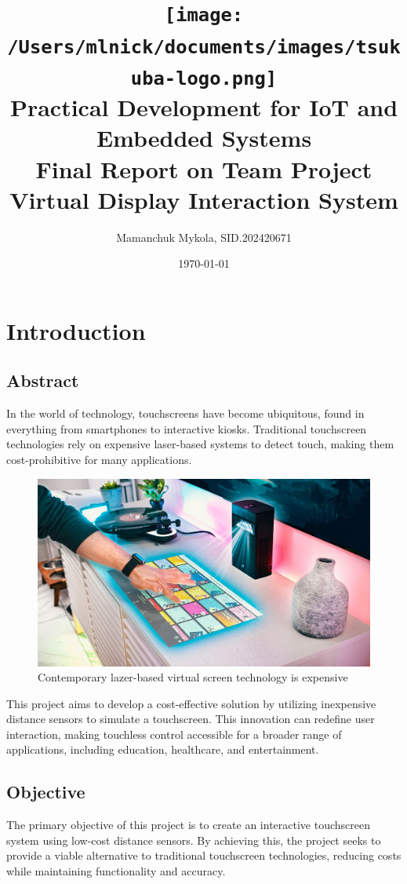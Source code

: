 \documentclass[12pt,a4paper]{article}
\title{
    \texttt{[image: /Users/mlnick/documents/images/tsukuba-logo.png]} \\
    \vspace{2mm}
    \textbf{Practical Development for IoT and Embedded Systems} \\
    \vspace{3mm}    
    Final Report on Team Project \\
    Virtual Display Interaction System
}
\author{Mamanchuk Mykola, SID.202420671}
\date{\today}
\begin{document}
\maketitle

\section{Introduction}

\subsection{Abstract}
In the world of technology, touchscreens have become ubiquitous, found in everything from smartphones to interactive kiosks. Traditional touchscreen technologies rely on expensive laser-based systems to detect touch, making them cost-prohibitive for many applications. 

\begin{figure}[!htp]
    \centering
    \includegraphics[scale=0.5]{../IoT Materials/article images/0-Expensive-lazer-technology.png}
    \caption{Contemporary lazer-based virtual screen technology is expensive}
\end{figure}

This project aims to develop a cost-effective solution by utilizing inexpensive distance sensors to simulate a touchscreen. This innovation can redefine user interaction, making touchless control accessible for a broader range of applications, including education, healthcare, and entertainment.

\subsection{Objective}
The primary objective of this project is to create an interactive touchscreen system using low-cost distance sensors. By achieving this, the project seeks to provide a viable alternative to traditional touchscreen technologies, reducing costs while maintaining functionality and accuracy.
\end{document}
